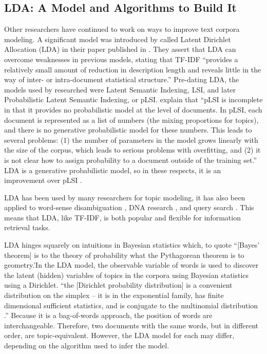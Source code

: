 \subsection{LDA: A Model and Algorithms to Build It}
Other researchers have continued to work on ways to improve text corpora modeling. A significant model was introduced by \citeauthor{Blei:2003:LDA:944919.944937} called Latent Dirichlet Allocation (LDA) in their paper published in \citeyear{Blei:2003:LDA:944919.944937} \citep{Blei:2003:LDA:944919.944937}. They assert that LDA can overcome weaknesses in previous models, stating that TF-IDF ``provides a relatively small amount of reduction in description length and reveals little in the way of inter- or intra-document statistical structure.'' Pre-dating LDA, the models used by researched were Latent Semantic Indexing, LSI, and later Probabilistic Latent Semantic Indexing, or pLSI. \citeauthor{Blei:2003:LDA:944919.944937} explain that ``pLSI is incomplete in that it provides no probabilistic model at the level of documents. In pLSI, each document is represented as a list of numbers (the mixing proportions for topics), and there is no generative probabilistic model for these numbers. This leads to several problems: (1) the number of parameters in the model grows linearly with the size of the corpus, which leads to serious problems with overfitting, and (2) it is not clear how to assign probability to a document outside of the training set.'' LDA is a generative probabilistic model, so in these respects, it is an improvement over pLSI \citeyearpar{Blei:2003:LDA:944919.944937}.

LDA has been used by many researchers for topic modeling, it has also been applied to word-sense disambiguation \citep{boyd2007topic}, DNA research \citep{Pritchard945, huelsenbeck2006dirichlet, shivashankar2011multi}, and query search \cite{Wei:2006:LDM:1148170.1148204}. This means that LDA, like TF-IDF, is both popular and flexible for information retrieval tasks.
 
LDA hinges squarely on intuitions in Bayesian statistics which, to quote \cite{jeffreys1973scientific} ``[Bayes' theorem] is to the theory of probability what the Pythagorean theorem is to geometry.'In the LDA model, the observable variable of words is used to discover the latent (hidden) variables of topics in the corpora using Bayesian statistics using a Dirichlet. ``the [Dirichlet probability distribution] is a convenient distribution on the simplex -- it is in the exponential family, has finite dimensional sufficient statistics, and is conjugate to the multinomial distribution \citep{jeffreys1973scientific}.'' Because it is a bag-of-words approach, the position of words are interchangeable. Therefore, two documents with the same words, but in different order, are topic-equivalent. However, the LDA model for each may differ, depending on the algorithm used to infer the model.


